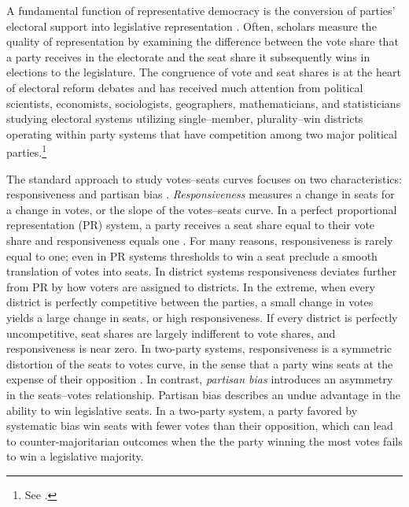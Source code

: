 \documentclass[letter,12pt]{article}
\begin{document}
\noindent A fundamental function of representative democracy is the conversion of parties' electoral support into legislative representation \citep{lijphartElSysPtySys.1994}. Often, scholars measure the quality of representation by examining the difference between the vote share that a party receives in the electorate and the seat share it subsequently wins in elections to the legislature. The congruence of vote and seat shares is at the heart of electoral reform debates and has received much attention from political scientists, economists, sociologists, geographers, mathematicians, and statisticians studying electoral systems utilizing single--member, plurality--win districts operating within party systems that have competition among two major political parties.\footnote{See \citet{altman.mcdonald2011bard,balinskiYoung2001FairRep,brady.grofmanBiasResponsiveness1991,cain.partisanRedistricting.1985,cox.katz.2002,engstrom2006redisttrictApsr,erikson1972malapportionment,gelman.king.1994EvalElSysRedis,grofmanBiasProportionality.1983,grofman.etalBiasMalapp.1997,gudgin.taylor.1980decomposeBias,johnston.2002,kendall.stuartCubeLaw1950,king.browning1987biasRespUS,niemi.fett1986swing,rae.1967,rossiter.etal.1997,taagepera.CubeLaw.1973,trelles.mtz.polygob2012,tufte1973seatsVotes}.\label{fn:cites}}

The standard approach to study votes--seats curves focuses on two characteristics: responsiveness and partisan bias \citep{tufte1973seatsVotes,king.browning1987biasRespUS}. \emph{Responsiveness} measures a change in seats for a change in votes, or the slope of the votes--seats curve. In a perfect proportional representation (PR) system, a party receives a seat share equal to their vote share and responsiveness equals one \citep{taagepera.shugart.1989,linzerSeatVoteElasticity2012}. For many reasons, responsiveness is rarely equal to one; even in PR systems thresholds to win a seat preclude a smooth translation of votes into seats. In district systems responsiveness deviates further from PR by how voters are assigned to districts. In the extreme, when every district is perfectly competitive between the parties, a small change in votes yields a large change in seats, or high responsiveness. If every district is perfectly uncompetitive, seat shares are largely indifferent to vote shares, and responsiveness is near zero. In two-party systems, responsiveness is a symmetric distortion of the seats to votes curve, in the sense that a party wins seats at the expense of their opposition \citep{grofman.king.2008.partisansymmetry}. In contrast, \emph{partisan bias} introduces an asymmetry in the seats--votes relationship. Partisan bias describes an undue advantage in the ability to win legislative seats. In a two-party system, a party favored by systematic bias win seats with fewer votes than their opposition, which can lead to counter-majoritarian outcomes when the the party winning the most votes fails to win a legislative majority.
\end{document}
